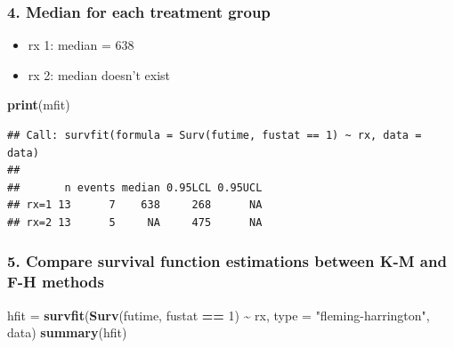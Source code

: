 \documentclass[
]{article}
\newenvironment{Shaded}{\begin{snugshade}}{\end{snugshade}}
\newcommand{\AttributeTok}[1]{\textcolor[rgb]{0.13,0.29,0.53}{#1}}
\newcommand{\DecValTok}[1]{\textcolor[rgb]{0.00,0.00,0.81}{#1}}
\newcommand{\FunctionTok}[1]{\textcolor[rgb]{0.13,0.29,0.53}{\textbf{#1}}}
\newcommand{\NormalTok}[1]{#1}
\newcommand{\OtherTok}[1]{\textcolor[rgb]{0.56,0.35,0.01}{#1}}
\newcommand{\SpecialCharTok}[1]{\textcolor[rgb]{0.81,0.36,0.00}{\textbf{#1}}}
\newcommand{\StringTok}[1]{\textcolor[rgb]{0.31,0.60,0.02}{#1}}
\providecommand{\tightlist}{%
  \setlength{\itemsep}{0pt}\setlength{\parskip}{0pt}}
\begin{document}
\hypertarget{median-for-each-treatment-group}{%
\subsubsection{4. Median for each treatment
group}\label{median-for-each-treatment-group}}

\begin{itemize}
\tightlist
\item
  rx 1: median = 638
\item
  rx 2: median doesn't exist
\end{itemize}

\begin{Shaded}
\begin{Highlighting}[]
\FunctionTok{print}\NormalTok{(mfit)}
\end{Highlighting}
\end{Shaded}

\begin{verbatim}
## Call: survfit(formula = Surv(futime, fustat == 1) ~ rx, data = data)
## 
##       n events median 0.95LCL 0.95UCL
## rx=1 13      7    638     268      NA
## rx=2 13      5     NA     475      NA
\end{verbatim}

\hypertarget{compare-survival-function-estimations-between-k-m-and-f-h-methods}{%
\subsubsection{5. Compare survival function estimations between K-M and
F-H
methods}\label{compare-survival-function-estimations-between-k-m-and-f-h-methods}}

\begin{Shaded}
\begin{Highlighting}[]
\NormalTok{hfit }\OtherTok{=} \FunctionTok{survfit}\NormalTok{(}\FunctionTok{Surv}\NormalTok{(futime, fustat }\SpecialCharTok{==} \DecValTok{1}\NormalTok{) }\SpecialCharTok{\textasciitilde{}}\NormalTok{ rx, }\AttributeTok{type =} \StringTok{"fleming{-}harrington"}\NormalTok{, data)}
\FunctionTok{summary}\NormalTok{(hfit)}
\end{Highlighting}
\end{Shaded}
\end{document}
